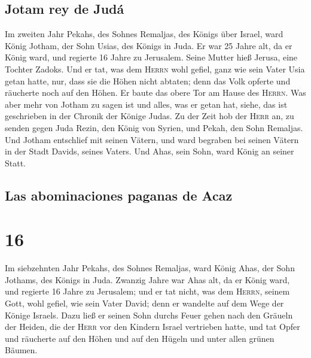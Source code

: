 \hypertarget{jotam-rey-de-juduxe1}{%
\subsection{Jotam rey de Judá}\label{jotam-rey-de-juduxe1}}

 Im zweiten Jahr Pekahs, des Sohnes Remaljas, des Königs
über Israel, ward König Jotham, der Sohn Usias, des Königs in Juda.
 Er war 25 Jahre alt, da er König ward, und regierte 16
Jahre zu Jerusalem. Seine Mutter hieß Jerusa, eine Tochter Zadoks.
 Und er tat, was dem \textsc{Herrn} wohl gefiel, ganz wie
sein Vater Usia getan hatte,  nur, dass sie die Höhen
nicht abtaten; denn das Volk opferte und räucherte noch auf den Höhen.
Er baute das obere Tor am Hause des \textsc{Herrn}.  Was
aber mehr von Jotham zu sagen ist und alles, was er getan hat, siehe,
das ist geschrieben in der Chronik der Könige Judas.  Zu
der Zeit hob der \textsc{Herr} an, zu senden gegen Juda Rezin, den König
von Syrien, und Pekah, den Sohn Remaljas.  Und Jotham
entschlief mit seinen Vätern, und ward begraben bei seinen Vätern in der
Stadt Davids, seines Vaters.  Und Ahas, sein Sohn, ward
König an seiner Statt.

\hypertarget{las-abominaciones-paganas-de-acaz}{%
\subsection{Las abominaciones paganas de
Acaz}\label{las-abominaciones-paganas-de-acaz}}

\hypertarget{section-15}{%
\section{16}\label{section-15}}

 Im siebzehnten Jahr Pekahs, des Sohnes Remaljas, ward
König Ahas, der Sohn Jothams, des Königs in Juda.  Zwanzig
Jahre war Ahas alt, da er König ward, und regierte 16 Jahre zu
Jerusalem; und er tat nicht, was dem \textsc{Herrn}, seinem Gott, wohl
gefiel, wie sein Vater David;  denn er wandelte auf dem
Wege der Könige Israels. Dazu ließ er seinen Sohn durchs Feuer gehen
nach den Gräueln der Heiden, die der \textsc{Herr} vor den Kindern
Israel vertrieben hatte,  und tat Opfer und räucherte auf
den Höhen und auf den Hügeln und unter allen grünen Bäumen.

